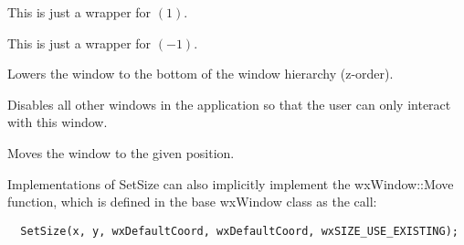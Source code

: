 This is just a wrapper for $(1)$.


\label{wxwindowlineup}

This is just a wrapper for $(-1)$.


\label{wxwindowlower}


Lowers the window to the bottom of the window hierarchy (z-order).




\label{wxwindowmakemodal}


Disables all other windows in the application so that
the user can only interact with this window.




\label{wxwindowmove}



Moves the window to the given position.






Implementations of SetSize can also implicitly implement the
wxWindow::Move function, which is defined in the base wxWindow class
as the call:

\begin{verbatim}
  SetSize(x, y, wxDefaultCoord, wxDefaultCoord, wxSIZE_USE_EXISTING);
\end{verbatim}



